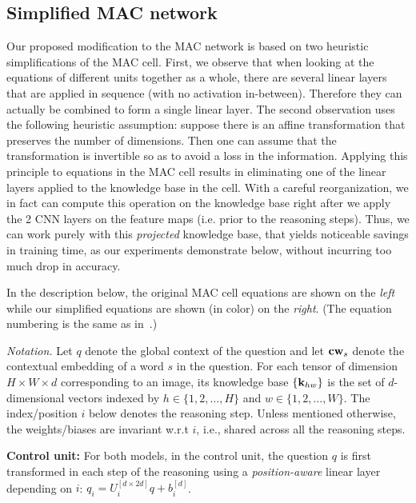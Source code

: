 \subsection{Simplified MAC network}
Our proposed modification to the MAC network is based on two heuristic
simplifications of the MAC cell. 
First, we observe that when looking at the equations of different units
together as a whole, there are several linear layers
that are applied in sequence (with no activation in-between).
Therefore they can actually be combined to form a single linear layer.
The second observation uses the following heuristic assumption:
suppose there is an affine transformation that preserves the number
of dimensions. Then one can assume that the transformation is invertible
so as to avoid a loss in the information. Applying this principle to 
equations in the MAC cell results in eliminating one of the linear layers applied to
the knowledge base in the cell. With a careful reorganization, we in fact
can compute this operation on the knowledge base right after we apply the 2 
 CNN layers on the feature maps (i.e. prior to the reasoning steps). Thus, we can work purely
with this \emph{projected} knowledge base, that yields
noticeable savings in training time, as our experiments demonstrate
below, without incurring too much drop in accuracy.

In the description below, the original MAC cell equations are shown on the \emph{left}
while our simplified equations are shown (in color) on the {\color{Plum} \emph{right}}.
(The equation numbering is the same as in~\cite{hudson2018compositional}.)

\noindent\textit{Notation.}
Let $q$ denote the global context of the question
and let $\mathbf{cw}_s$ denote the contextual embedding of a word $s$ in the question.
For each tensor of dimension $H \times W \times d$ corresponding to an image,
its knowledge base $\{ \mathbf{k}_{hw}\}$ is the set of $d$-dimensional vectors indexed by 
$h \in \{1,2,\dots,H\}$ and $w \in \{1,2,\dots, W\}$.
The index/position $i$ below denotes the reasoning step. 
Unless mentioned otherwise, the weights/biases are invariant w.r.t $i$, 
i.e., shared across all the reasoning steps. 

\noindent\textbf{Control unit:} 
For both models, in the control unit, the question $q$ is first transformed in each step of 
the reasoning using a \emph{position-aware}
linear layer depending on $i$: $q_i = U_i^{[d \times 2d]} q + b_i^{[d]}$.

